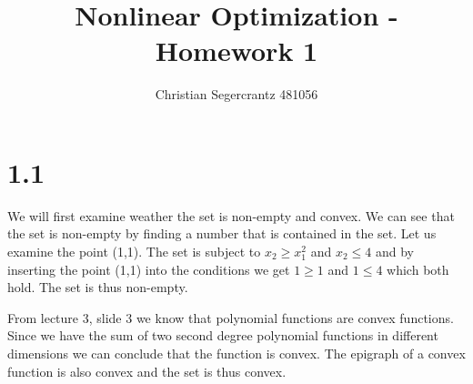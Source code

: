 \documentclass{article}
\title{Nonlinear Optimization - Homework 1 }
\author{Christian Segercrantz 481056}
\begin{document}
	\maketitle
	\pagebreak
\section*{1.1}
	We will first examine weather the set is non-empty and convex. We can see that the set is non-empty by finding a number that is contained in the set. Let us examine the point (1,1). The set is subject to $x_2 \geq x_1^2$ and $x_2 \leq 4$ and by inserting the point (1,1) into the conditions we get $1 \geq 1$ and $1 \leq 4$ which both hold. The set is thus non-empty.
	
	From lecture 3, slide 3 we know that polynomial functions are convex functions. Since we have the sum of two second degree polynomial functions in different dimensions we can conclude that the function is convex. The epigraph of a convex function is also convex and the set is thus convex.
	
\end{document}

